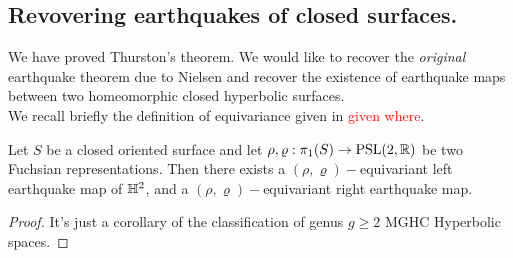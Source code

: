 \subsection{Revovering earthquakes of closed surfaces.}
We have proved Thurston's theorem. We would like to recover the \textit{original} earthquake theorem due to Nielsen and recover the existence of earthquake maps between two homeomorphic closed hyperbolic surfaces.\\
We recall briefly the definition of equivariance given in \textcolor{red}{given where}. 

\begin{corollary}
    Let $S$ be a closed oriented surface and let $\rho,\varrho:\pi_1(S)\to\text{PSL}(2,\mathbb{R})$ be two Fuchsian representations. Then there exists a $(\rho,\varrho)-$equivariant left earthquake map of $\mathbb{H}^2$, and a $(\rho,\varrho)-$equivariant right earthquake map. 
\end{corollary}

\begin{proof}
    It's just a corollary of the classification of genus $g\geq 2$ MGHC Hyperbolic spaces.
\end{proof}